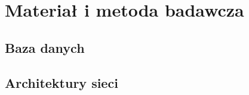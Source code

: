 \chapter{Materiał i metoda badawcza}\label{ch:materia-i-metoda-badawcza}


\section{Baza danych}\label{sec:baza-danych}


\section{Architektury sieci}\label{sec:architektury-sieci}
